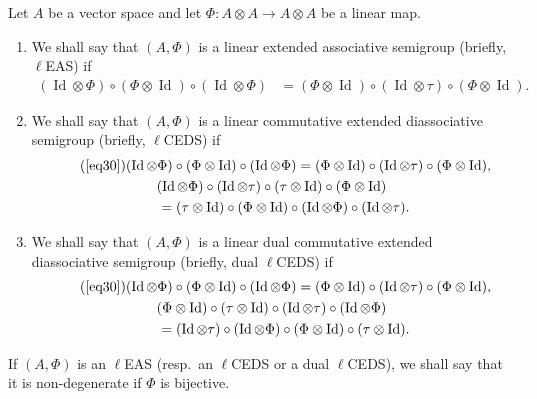 \documentclass[10pt,a4paper]{amsart}
\numberwithin{equation}{section}
\begin{document}
\begin{Definition}\label{defi4.1}
Let $A$ be a vector space and let $\Phi\colon A\otimes A\longrightarrow A\otimes A$ be a linear map.
\begin{enumerate}\itemsep=0pt
\item[(1)] We shall say that $(A,\Phi)$ is a linear extended associative semigroup (briefly, $\ell$EAS) if
\begin{align}
\label{eq30}
(\operatorname{Id} \otimes \Phi)\circ (\Phi\otimes \operatorname{Id})\circ (\operatorname{Id} \otimes \Phi)&=(\Phi \otimes \operatorname{Id})\circ (\operatorname{Id} \otimes \tau)\circ (\Phi\otimes \operatorname{Id}).
\end{align}
\item[(2)] We shall say that $(A,\Phi)$ is a linear commutative extended diassociative semigroup (briefly, $\ell$CEDS) if
\begin{gather}
\tag{\ref{eq30}}(\operatorname{Id} \otimes \Phi)\circ (\Phi\otimes \operatorname{Id})\circ (\operatorname{Id} \otimes \Phi) =(\Phi \otimes \operatorname{Id})\circ (\operatorname{Id} \otimes \tau)\circ (\Phi\otimes \operatorname{Id}),\\
(\operatorname{Id} \otimes \Phi)\circ (\operatorname{Id} \otimes \tau) \circ (\tau \otimes \operatorname{Id})\circ (\Phi \otimes \operatorname{Id})\nonumber\\
\qquad =(\tau \otimes \operatorname{Id})\circ (\Phi \otimes \operatorname{Id})\circ (\operatorname{Id} \otimes \Phi)\circ (\operatorname{Id} \otimes \tau).\label{eq31}
\end{gather}
\item[(3)] We shall say that $(A,\Phi)$ is a linear dual commutative extended diassociative semigroup (briefly, dual $\ell$CEDS) if
\begin{gather}
\tag{\ref{eq30}}(\operatorname{Id} \otimes \Phi)\circ (\Phi\otimes \operatorname{Id})\circ (\operatorname{Id} \otimes \Phi)=(\Phi \otimes \operatorname{Id})\circ (\operatorname{Id} \otimes \tau)\circ (\Phi\otimes \operatorname{Id}),\\
(\Phi \otimes \operatorname{Id})\circ (\tau \otimes \operatorname{Id})\circ (\operatorname{Id} \otimes \tau)\circ (\operatorname{Id} \otimes \Phi)\nonumber\\
\qquad=(\operatorname{Id} \otimes \tau)\circ (\operatorname{Id} \otimes \Phi)\circ (\Phi \otimes \operatorname{Id})\circ (\tau \otimes \operatorname{Id}).\label{eq32}
\end{gather}\end{enumerate}
If $(A,\Phi)$ is an $\ell$EAS (resp.\ an $\ell$CEDS or a dual $\ell$CEDS), we shall say that it is non-degenerate if $\Phi$ is bijective.
\end{Definition}
\end{document}
